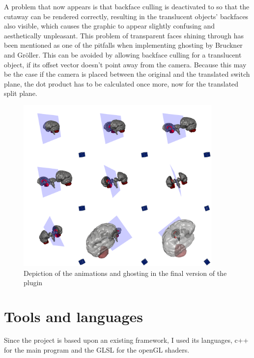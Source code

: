 A problem that now appears is that backface culling is deactivated to so that the cutaway can be rendered correctly, resulting in the translucent objects' backfaces also visible, which causes the graphic to appear slightly confusing and aesthetically unpleasant. This problem of transparent faces shining through has been mentioned as one of the pitfalls when implementing ghosting by Bruckner and Gr\"oller\cite{proc:bruckner-2006-EVV}. This can be avoided by allowing backface culling for a translucent object, if its offset vector doesn't point away from the camera. Because this may be the case if the camera is placed between the original and the translated switch plane, the dot product has to be calculated once more, now for the translated split plane.\\
\begin{figure}[tb]
	\centering
	\includegraphics[width=0.9\textwidth]{chapters/figures/brainstem}
	\caption{Depiction of the animations and ghosting in the final version of the plugin}
	\label{fig:brainstem}
\end{figure}
\section {Tools and languages}
Since the project is based upon an existing framework, I used its languages, c++ for the main program and the GLSL for the openGL shaders.
